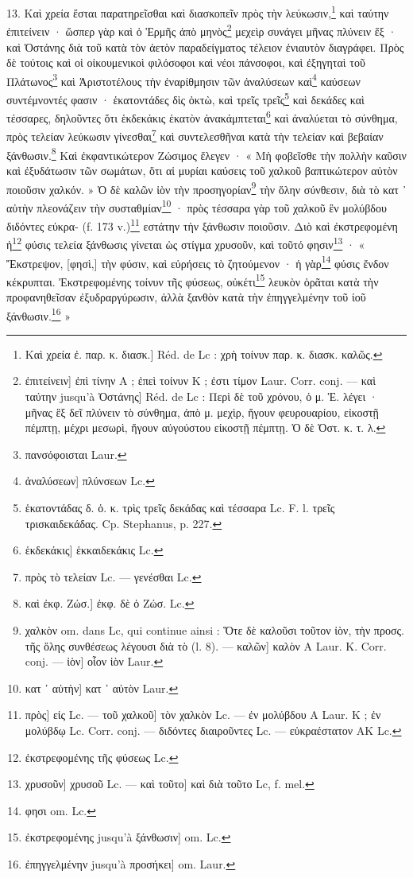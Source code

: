 \documentclass[a4paper, 11pt, oneside, polutonikogreek, french]{article}
\begin{document}
13. Καὶ χρεία ἔσται παρατηρεῖσθαι καὶ διασκοπεῖν πρὸς τὴν λεύκωσιν,\footnote{Καὶ χρεία ἐ. παρ. κ. διασκ.] Réd. de Lc : χρὴ τοίνυν παρ. κ. διασκ. καλῶς.} καὶ ταύτην ἐπιτείνειν · ὥσπερ γὰρ καὶ ὁ Ἑρμῆς ἀπὸ μηνὸς\footnote{ἐπιτείνειν] ἐπὶ τίνην A ; ἐπεὶ τοίνυν K ; ἐστι τίμον Laur. Corr. conj. --- καὶ ταύτην jusqu'à Ὀστάνης] Réd. de Lc : Περὶ δὲ τοῦ χρόνου, ὁ μ. Ἑ. λέγει · μῆνας ἓξ δεῖ πλύνειν τὸ σύνθημα, ἀπὸ μ. μεχὶρ, ἤγουν φευρουαρίου, εἰκοστῇ πέμπτῃ, μέχρι μεσωρὶ, ἤγουν αὐγούστου εἰκοστῇ πέμπτῃ. Ὁ δὲ Ὁστ. κ. τ. λ.} μεχεὶρ συνάγει μῆνας πλύνειν ἕξ · καὶ Ὀστάνης διὰ τοῦ κατὰ τὸν ἀετὸν παραδείγματος τέλειον ἐνιαυτὸν διαγράφει. Πρὸς δὲ τούτοις καὶ οἱ οἰκουμενικοὶ φιλόσοφοι καὶ νέοι πάνσοφοι, καὶ ἐξηγηταὶ τοῦ Πλάτωνος\footnote{πανσόφοισται Laur.} καὶ Ἀριστοτέλους τὴν ἐναρίθμησιν τῶν ἀναλύσεων καὶ\footnote{ἀναλύσεων] πλύνσεων Lc.} καύσεων συντέμνοντές φασιν · ἑκατοντάδες δὶς ὀκτὼ, καὶ τρεῖς τρεῖς\footnote{ἑκατοντάδας δ. ὁ. κ. τρὶς τρεῖς δεκάδας καὶ τέσσαρα Lc. F. l. τρεῖς τρισκαιδεκάδας. Cp. Stephanus, p. 227.} καὶ δεκάδες καὶ τέσσαρες, δηλοῦντες ὅτι ἑκδεκάκις ἑκατὸν ἀνακάμπτεται\footnote{ἑκδεκάκις] ἑκκαιδεκάκις Lc.} καὶ ἀναλύεται τὸ σύνθημα, πρὸς τελείαν λεύκωσιν γίνεσθαι\footnote{πρὸς τὸ τελείαν Lc. --- γενέσθαι Lc.} καὶ συντελεσθῆναι κατὰ τὴν τελείαν καὶ βεβαίαν ξάνθωσιν.\footnote{καὶ ἐκφ. Ζώσ.] ἐκφ. δὲ ὁ Ζώσ. Lc.} Καὶ ἐκφαντικώτερον Ζώσιμος ἔλεγεν · « Μὴ φοβεῖσθε τὴν πολλὴν καῦσιν καὶ ἐξυδάτωσιν τῶν σωμάτων, ὅτι αἱ μυρίαι καύσεις τοῦ χαλκοῦ βαπτικώτερον αὐτὸν ποιοῦσιν χαλκόν. » Ὁ δὲ καλῶν ἰὸν τὴν προσηγορίαν\footnote{χαλκὸν om. dans Lc, qui continue ainsi : Ὅτε δὲ καλοῦσι τοῦτον ἰὸν, τὴν προσς. τῆς ὅλης συνθέσεως λέγουσι διὰ τὸ (l. 8). --- καλῶν] καλὸν A Laur. K. Corr. conj. --- ἰὸν] οἷον ἰὸν Laur.} τὴν ὅλην σύνθεσιν, διὰ τὸ κατ ᾽ αὐτὴν πλεονάζειν τὴν συσταθμίαν\footnote{κατ ᾽ αὐτὴν] κατ ᾽ αὐτὸν Laur.} · πρὸς τέσσαρα γὰρ τοῦ χαλκοῦ ἓν μολύβδου διδόντες εὐκρα- (f. 173 v.)\footnote{πρὸς] εἰς Lc. --- τοῦ χαλκοῦ] τὸν χαλκὸν Lc. --- ἐν μολύβδου A Laur. K ; ἐν μολύβδῳ Lc. Corr. conj. --- διδόντες διαιροῦντες Lc. --- εὐκραέστατον AK Lc.} εστάτην τὴν ξάνθωσιν ποιοῦσιν. Διὸ καὶ ἐκστρεφομένη ἡ\footnote{ἐκστρεφομένης τῆς φύσεως Lc.} φύσις τελεία ξάνθωσις γίνεται ὡς στίγμα χρυσοῦν, καὶ τοῦτό φησιν\footnote{χρυσοῦν] χρυσοῦ Lc. --- καὶ τοῦτο] καὶ διὰ τοῦτο Lc, f. mel.} · « Ἔκστρεψον, [φησὶ,] τὴν φύσιν, καὶ εὑρήσεις τὸ ζητούμενον · ἡ γὰρ\footnote{φησι om. Lc.} φύσις ἔνδον κέκρυπται. Ἐκστρεφομένης τοίνυν τῆς φύσεως, οὐκέτι\footnote{ἐκστρεφομένης jusqu'à ξάνθωσιν] om. Lc.} λευκὸν ὁρᾶται κατὰ τὴν προφανηθεῖσαν ἐξυδραργύρωσιν, ἀλλὰ ξανθὸν κατὰ τὴν ἐπηγγελμένην τοῦ ἰοῦ ξάνθωσιν.\footnote{ἐπηγγελμένην jusqu'à προσήκει] om. Laur.} »
\end{document}

